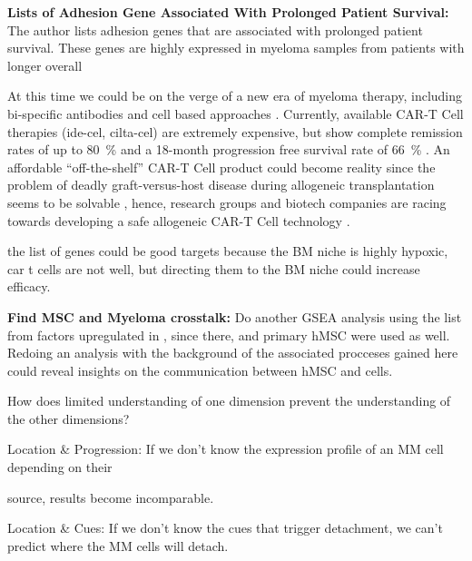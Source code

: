 




\textbf{Lists of Adhesion Gene Associated With Prolonged Patient Survival:}
The author lists adhesion genes that are associated with prolonged patient
survival. These genes are highly expressed in myeloma samples from patients with
longer overall

At this time we could be on the verge of a new era of myeloma therapy,
including bi-specific antibodies and cell based approaches
\cite{moreNovelImmunotherapiesCombinations2023,
      engelhardtFunctionalCureLongterm2024}. Currently, available CAR-T Cell therapies
(ide-cel, cilta-cel) are extremely expensive, but show complete remission rates
of up to \SI{80}{\percent} and a 18-month progression free survival rate of
\SI{66}{\percent} \cite{bobinRecentAdvancesTreatment2022}. An affordable
``off-the-shelf'' CAR-T Cell product could become reality since the problem of
deadly graft-versus-host disease during allogeneic transplantation seems to be
solvable \cite{qasimMolecularRemissionInfant2017}, hence, research groups and
biotech companies are racing towards developing a safe allogeneic CAR-T Cell
technology \cite{depilOfftheshelfAllogeneicCAR2020}.


the list of genes could be good targets because the BM niche is highly hypoxic,
car t cells are not well, but directing them to the BM niche could increase
efficacy.


\textbf{Find MSC and Myeloma crosstalk:}
Do another GSEA analysis using the list from factors upregulated in
\citet{dotterweichContactMyelomaCells2016}, since there, \INA and primary
\ac{hMSC} were used as well. Redoing an analysis with the background of the
associated procceses gained here could reveal insights on the communication
between \ac{hMSC} and \INA cells.



%
\label{sec:discussion_conclusion_cancer}%



How does limited understanding of one dimension prevent the understanding of the
other dimensions?

Location \& Progression: If we don't know the expression profile of an MM cell
depending on their

source, results become incomparable.

Location \& Cues: If we don't know the cues that trigger detachment, we can't
predict where the MM cells will detach.



